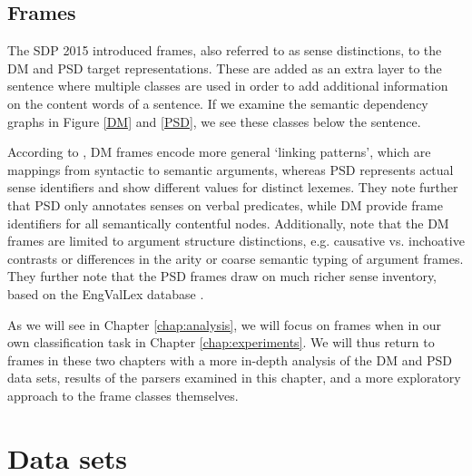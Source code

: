 \subsection{Frames}
\label{sec:frames}

The SDP 2015 introduced frames, also referred to as sense distinctions, to the DM and PSD target representations. These are added as an extra layer to the sentence where multiple classes are used in order to add additional information on the content words of a sentence. If we examine the semantic dependency graphs in Figure \ref{DM} and \ref{PSD}, we see these classes below the sentence.

According to , DM frames encode more general `linking patterns', which are mappings from syntactic to semantic arguments, whereas PSD represents actual sense identifiers and show different values for distinct lexemes. They note further that PSD only annotates senses on verbal predicates, while DM provide frame identifiers for all semantically contentful nodes. Additionally,  note that the DM frames are limited to argument structure distinctions, e.g. causative vs. inchoative contrasts or differences in the arity or coarse semantic typing of argument frames. They further note that the PSD frames draw on much richer sense inventory, based on the EngValLex database \cite{Cinkova:06}.

As we will see in Chapter \ref{chap:analysis}, we will focus on frames when in our own classification task in Chapter \ref{chap:experiments}. We will thus return to frames in these two chapters with a more in-depth analysis of the DM and PSD data sets, results of the parsers examined in this chapter, and a more exploratory approach to the frame classes themselves.

\section{Data sets}
\label{sec:data-sets}

